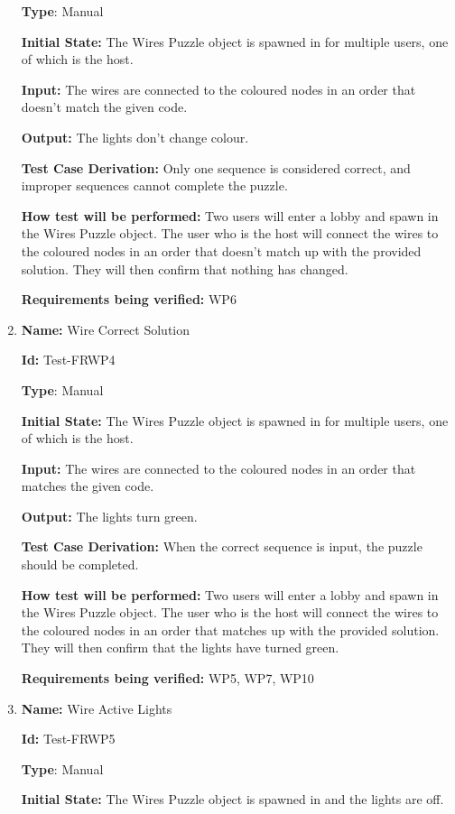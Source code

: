 \documentclass[12pt, titlepage]{article}
\begin{document}
\begin{enumerate}
\textbf{Type}: Manual

\textbf{Initial State:} The Wires Puzzle object is spawned in for multiple users, one of which is the host.

\textbf{Input:} The wires are connected to the coloured nodes in an order that doesn't match the given code. 

\textbf{Output:} The lights don't change colour. 

\textbf{Test Case Derivation:} Only one sequence is considered correct, and improper sequences cannot complete the puzzle. 

\textbf{How test will be performed:} Two users will enter a lobby and spawn in the Wires Puzzle object. The user who is the host will connect the wires to the coloured nodes in an order that doesn't match up with the provided solution. They will then confirm that nothing has changed. 

\textbf{Requirements being verified: } WP6

\item{\textbf{Name:} Wire Correct Solution} \label{itm:Test-FRWP4}

\textbf{Id:} Test-FRWP4

\textbf{Type}: Manual

\textbf{Initial State:} The Wires Puzzle object is spawned in for multiple users, one of which is the host.

\textbf{Input:} The wires are connected to the coloured nodes in an order that matches the given code. 

\textbf{Output:} The lights turn green.

\textbf{Test Case Derivation:} When the correct sequence is input, the puzzle should be completed. 

\textbf{How test will be performed:} Two users will enter a lobby and spawn in the Wires Puzzle object. The user who is the host will connect the wires to the coloured nodes in an order that matches up with the provided solution. They will then confirm that the lights have turned green.

\textbf{Requirements being verified: } WP5, WP7, WP10

\item{\textbf{Name:} Wire Active Lights} \label{itm:Test-FRWP5}

\textbf{Id:} Test-FRWP5

\textbf{Type}: Manual

\textbf{Initial State:} The Wires Puzzle object is spawned in and the lights are off.


\end{enumerate}
\end{document}
